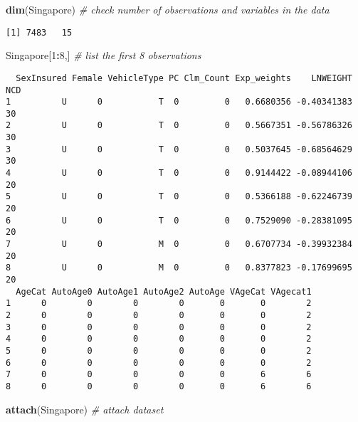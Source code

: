 \documentclass[]{book}
\newenvironment{Shaded}{\begin{snugshade}}{\end{snugshade}}
\newcommand{\KeywordTok}[1]{\textcolor[rgb]{0.13,0.29,0.53}{\textbf{#1}}}
\newcommand{\DecValTok}[1]{\textcolor[rgb]{0.00,0.00,0.81}{#1}}
\newcommand{\CommentTok}[1]{\textcolor[rgb]{0.56,0.35,0.01}{\textit{#1}}}
\newcommand{\OperatorTok}[1]{\textcolor[rgb]{0.81,0.36,0.00}{\textbf{#1}}}
\newcommand{\NormalTok}[1]{#1}
\theoremstyle{definition}
\theoremstyle{definition}
\theoremstyle{definition}
\theoremstyle{remark}
\begin{document}
\begin{Shaded}
\begin{Highlighting}[]
\KeywordTok{dim}\NormalTok{(Singapore)  }\CommentTok{# check number of observations and variables in the data}
\end{Highlighting}
\end{Shaded}

\begin{verbatim}
[1] 7483   15
\end{verbatim}

\begin{Shaded}
\begin{Highlighting}[]
\NormalTok{Singapore[}\DecValTok{1}\OperatorTok{:}\DecValTok{8}\NormalTok{,]  }\CommentTok{# list the first 8 observations}
\end{Highlighting}
\end{Shaded}

\begin{verbatim}
  SexInsured Female VehicleType PC Clm_Count Exp_weights    LNWEIGHT NCD
1          U      0           T  0         0   0.6680356 -0.40341383  30
2          U      0           T  0         0   0.5667351 -0.56786326  30
3          U      0           T  0         0   0.5037645 -0.68564629  30
4          U      0           T  0         0   0.9144422 -0.08944106  20
5          U      0           T  0         0   0.5366188 -0.62246739  20
6          U      0           T  0         0   0.7529090 -0.28381095  20
7          U      0           M  0         0   0.6707734 -0.39932384  20
8          U      0           M  0         0   0.8377823 -0.17699695  20
  AgeCat AutoAge0 AutoAge1 AutoAge2 AutoAge VAgeCat VAgecat1
1      0        0        0        0       0       0        2
2      0        0        0        0       0       0        2
3      0        0        0        0       0       0        2
4      0        0        0        0       0       0        2
5      0        0        0        0       0       0        2
6      0        0        0        0       0       0        2
7      0        0        0        0       0       6        6
8      0        0        0        0       0       6        6
\end{verbatim}

\begin{Shaded}
\begin{Highlighting}[]
\KeywordTok{attach}\NormalTok{(Singapore)  }\CommentTok{# attach dataset}
\end{Highlighting}
\end{Shaded}
\end{document}
